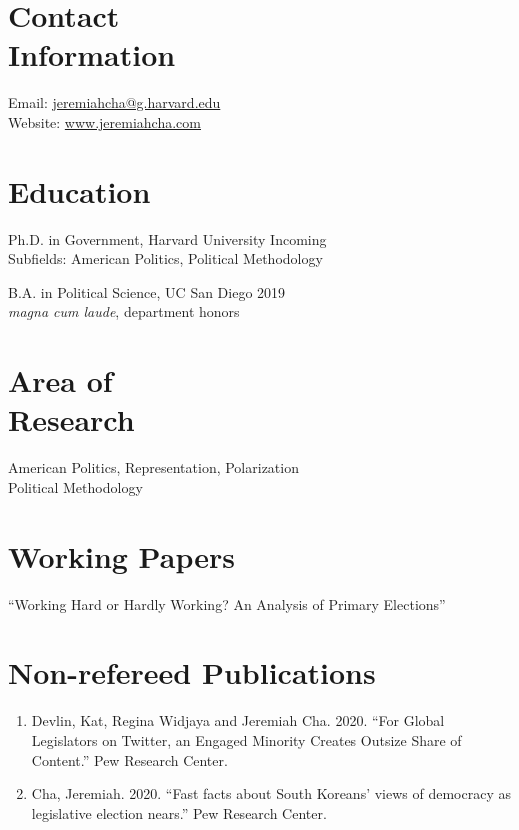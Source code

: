 \documentclass[margin, line]{res}
\begin{document}
\begin{resume}

\section{Contact \\ Information} 
Email: \href{mailto:jeremiahcha@g.harvard.edu}{jeremiahcha@g.harvard.edu}\\
Website: \href{httsp://www.jeremiahcha.com}{www.jeremiahcha.com}

\section{Education} 
Ph.D. in Government, Harvard University \hfill Incoming\\
\hspace*{5mm}Subfields: American Politics, Political Methodology

B.A. in Political Science, UC San Diego \hfill 2019\\
\hspace*{5mm}\textit{magna cum laude}, department honors

\section{Area of \\Research} 
American Politics, Representation, Polarization\\
Political Methodology

\section{Working Papers} 
``Working Hard or Hardly Working? An Analysis of Primary Elections''

\section{Non-refereed Publications}
\begin{enumerate}

\item Devlin, Kat, Regina Widjaya and Jeremiah Cha. 2020. ``For Global Legislators on Twitter, an Engaged Minority Creates Outsize Share of Content.'' Pew Research Center. 

\item Cha, Jeremiah. 2020. ``Fast facts about South Koreans’ views of democracy as legislative election nears.'' Pew Research Center.


\end{enumerate}
\end{resume}
\end{document}
